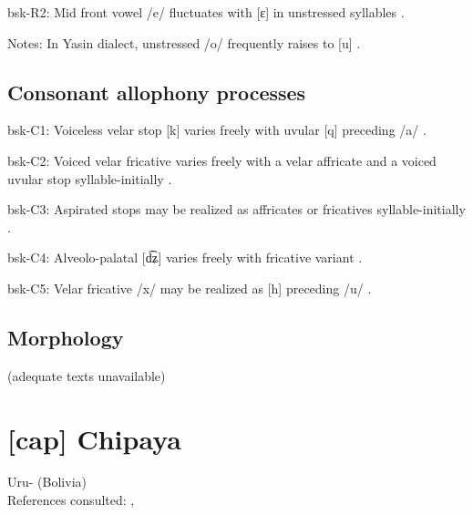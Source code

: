 {\begin{appendixdesc}
\item[bsk-R2:] Mid front vowel /e/ fluctuates with [ɛ] in unstressed syllables \citep[1029]{Anderson1997}.

\item[Notes:] In Yasin dialect, unstressed /o/ frequently raises to [u] \citep[1038]{Anderson1997}.
\end{appendixdesc}
\subsection*{Consonant allophony processes}
\begin{appendixdesc}

\item[bsk-C1:] Voiceless velar stop [k] varies freely with uvular [q] preceding /a/ \citep[1025]{Anderson1997}.

\item[bsk-C2:] Voiced velar fricative varies freely with a velar affricate and a voiced uvular stop syllable-initially \citep[1025]{Anderson1997}.

\item[bsk-C3:] Aspirated stops may be realized as affricates or fricatives syllable-initially \citep[1025]{Anderson1997}.

\item[bsk-C4:] Alveolo-palatal [d͡ʑ] varies freely with fricative variant \citep[1025]{Anderson1997}.

\item[bsk-C5:] Velar fricative /x/ may be realized as [h] preceding /u/ \citep[1025]{Anderson1997}.
\end{appendixdesc}
\subsection*{Morphology}


(adequate texts unavailable)
\section*{[cap] Chipaya} %
Uru- (Bolivia)\medskip\\
References consulted: \citet{Cerrón-Palomino2006}, \citet{Olson1967}

}
